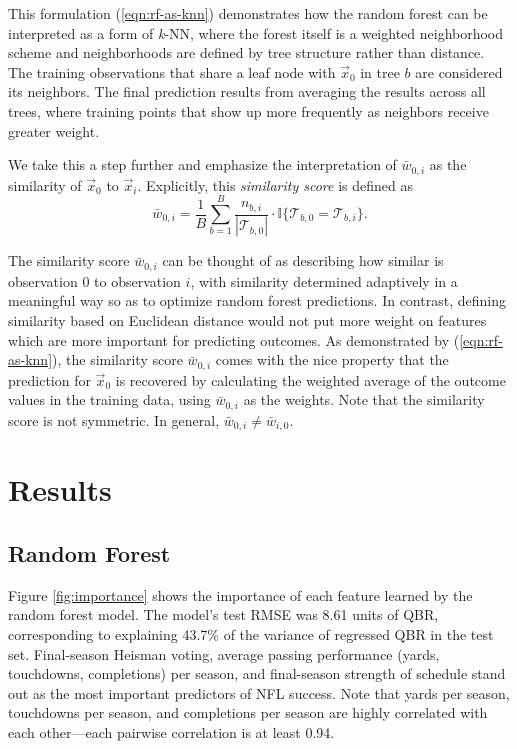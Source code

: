 \documentclass[Review, sageh, times]{sagej}
\begin{document}
This formulation (\ref{eqn:rf-as-knn}) demonstrates how the random forest can be interpreted as a form of \textit{k}-NN, where the forest itself is a weighted neighborhood scheme and neighborhoods are defined by tree structure rather than distance. The training observations that share a leaf node with $\vec x_0$ in tree $b$ are considered its neighbors. The final prediction results from averaging the results across all trees, where training points that show up more frequently as neighbors receive greater weight.

We take this a step further and emphasize the interpretation of $\bar w_{0,i}$ as the similarity of $\vec x_0$ to $\vec x_i$. Explicitly, this {\it similarity score} is defined as
\begin{equation}
  \label{eqn:similarity}
  \bar w_{0,i} = \frac{1}{B}\sum_{b = 1}^B
    \frac{n_{b,i}}{|\mathcal{T}_{b,0}|} \cdot \mathbb{I}\{\mathcal{T}_{b,0} = \mathcal{T}_{b,i}\}.
\end{equation}

The similarity score $\bar w_{0,i}$ can be thought of as describing how similar is observation 0 to observation $i$, with similarity determined adaptively in a meaningful way so as to optimize random forest predictions. In contrast, defining similarity based on Euclidean distance would not put more weight on features which are more important for predicting outcomes. As demonstrated by (\ref{eqn:rf-as-knn}), the similarity score $\bar w_{0,i}$ comes with the nice property that the prediction for $\vec x_0$ is recovered by calculating the weighted average of the outcome values in the training data, using $\bar w_{0,i}$ as the weights. Note that the similarity score is not symmetric. In general, $\bar w_{0,i} \ne \bar w_{i,0}$.

\section{Results}
\label{sec:results}

\subsection{Random Forest}

Figure \ref{fig:importance} shows the importance of each feature learned by the random forest model. The model's test RMSE was 8.61 units of QBR, corresponding to explaining 43.7\% of the variance of regressed QBR in the test set. Final-season Heisman voting, average passing performance (yards, touchdowns, completions) per season, and final-season strength of schedule stand out as the most important predictors of NFL success. Note that yards per season, touchdowns per season, and completions per season are highly correlated with each other---each pairwise correlation is at least 0.94.
\end{document}
